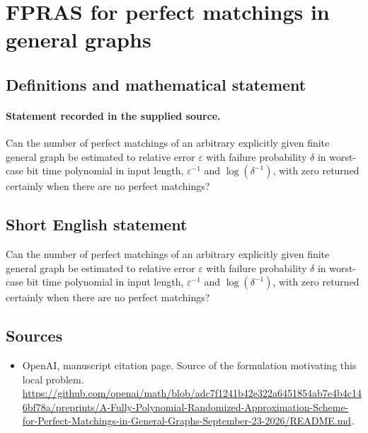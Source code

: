 \documentclass[11pt]{article}
\begin{document}
\section*{FPRAS for perfect matchings in general graphs}\label{statement}
\subsection{Definitions and mathematical statement}
\paragraph{Statement recorded in the supplied source.}
Can the number of perfect matchings of an arbitrary explicitly given finite general graph be estimated to relative error $\varepsilon $ with failure probability $\delta $ in worst-case bit time polynomial in input length, $\varepsilon ^{-1}$ and $\log (\delta ^{-1})$, with zero returned certainly when there are no perfect matchings?
\subsection{Short English statement}
Can the number of perfect matchings of an arbitrary explicitly given finite general graph be estimated to relative error $\varepsilon $ with failure probability $\delta $ in worst-case bit time polynomial in input length, $\varepsilon ^{-1}$ and $\log (\delta ^{-1})$, with zero returned certainly when there are no perfect matchings?
\subsection{Sources}
\begin{itemize}
\item[S1] OpenAI, manuscript citation page. Source of the formulation motivating this local problem.
\url{https://github.com/openai/math/blob/adc7f1241b42e322a6451854ab7e4b4c146bf78a/preprints/A-Fully-Polynomial-Randomized-Approximation-Scheme-for-Perfect-Matchings-in-General-Graphs-September-23-2026/README.md}.
\end{itemize}
\end{document}
